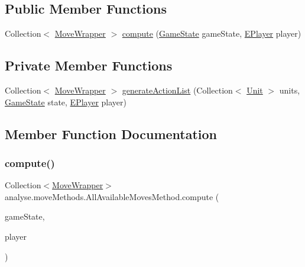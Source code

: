\subsection*{Public Member Functions}
\begin{DoxyCompactItemize}
\item 
Collection$<$ \mbox{\hyperlink{classanalyse_1_1_move_wrapper}{Move\+Wrapper}} $>$ \mbox{\hyperlink{classanalyse_1_1move_methods_1_1_all_available_moves_method_a24bb9dfcd70a39b15984b928ab46cee5}{compute}} (\mbox{\hyperlink{classgame_1_1game_state_1_1_game_state}{Game\+State}} game\+State, \mbox{\hyperlink{enumgame_1_1_e_player}{E\+Player}} player)
\end{DoxyCompactItemize}
\subsection*{Private Member Functions}
\begin{DoxyCompactItemize}
\item 
Collection$<$ \mbox{\hyperlink{classanalyse_1_1_move_wrapper}{Move\+Wrapper}} $>$ \mbox{\hyperlink{classanalyse_1_1move_methods_1_1_all_available_moves_method_a1b46ec313b796fcea3764e71e5d427c9}{generate\+Action\+List}} (Collection$<$ \mbox{\hyperlink{classgame_1_1board_1_1_unit}{Unit}} $>$ units, \mbox{\hyperlink{classgame_1_1game_state_1_1_game_state}{Game\+State}} state, \mbox{\hyperlink{enumgame_1_1_e_player}{E\+Player}} player)
\end{DoxyCompactItemize}


\subsection{Member Function Documentation}
\mbox{\label{classanalyse_1_1move_methods_1_1_all_available_moves_method_a24bb9dfcd70a39b15984b928ab46cee5}} 
\subsubsection{\texorpdfstring{compute()}{compute()}}
{\footnotesize\ttfamily Collection$<$\mbox{\hyperlink{classanalyse_1_1_move_wrapper}{Move\+Wrapper}}$>$ analyse.\+move\+Methods.\+All\+Available\+Moves\+Method.\+compute (\begin{DoxyParamCaption}\item[{\mbox{\hyperlink{classgame_1_1game_state_1_1_game_state}{Game\+State}}}]{game\+State,  }\item[{\mbox{\hyperlink{enumgame_1_1_e_player}{E\+Player}}}]{player }\end{DoxyParamCaption})\hspace{0.3cm}{\ttfamily [inline]}}



